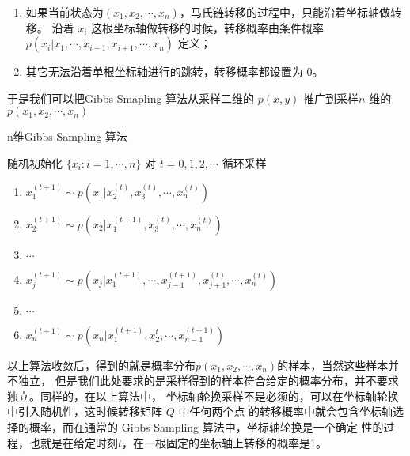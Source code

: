 \begin{enumerate}
\item 如果当前状态为$(x_1,x_2,\cdots, x_n)$，马氏链转移的过程中，只能沿着坐标轴做转移。
沿着 $x_i$ 这根坐标轴做转移的时候，转移概率由条件概率
 $p(x_i|x_1, \cdots, x_{i-1}, x_{i+1}, \cdots, x_n)$ 定义；
\item 其它无法沿着单根坐标轴进行的跳转，转移概率都设置为 0。
\end{enumerate}

于是我们可以把Gibbs Smapling 算法从采样二维的 $p(x,y)$ 推广到采样$n$ 维的 $p(x_1,x_2,\cdots, x_n)$
\begin{algorithm}[htb]
\caption{n维Gibbs Sampling 算法}
\begin{algorithmic}[1]
\STATE 随机初始化 $\{x_i : i =1, \cdots, n\}$
\STATE 对 $t=0,1,2,\cdots$ 循环采样
\begin{enumerate}
\item  $x_1^{(t+1)} \sim p(x_1|x_2^{(t)}, x_3^{(t)}, \cdots, x_n^{(t)})$
\item  $x_2^{(t+1)} \sim p(x_2|x_1^{(t+1)}, x_3^{(t)}, \cdots, x_n^{(t)})$
\item  $\cdots$
\item  $x_j^{(t+1)} \sim p(x_j|x_1^{(t+1)}, \cdots, x_{j-1}^{(t+1)}, x_{j+1}^{(t)}, \cdots, x_n^{(t)})$
\item  $\cdots$
\item  $x_n^{(t+1)} \sim p(x_n|x_1^{(t+1)}, x_2^t, \cdots, x_{n-1}^{(t+1)})$
\end{enumerate}
\end{algorithmic}
\end{algorithm}

以上算法收敛后，得到的就是概率分布$p(x_1,x_2,\cdots, x_n)$的样本，当然这些样本并不独立，
但是我们此处要求的是采样得到的样本符合给定的概率分布，并不要求独立。同样的，在以上算法中，
坐标轴轮换采样不是必须的，可以在坐标轴轮换中引入随机性，这时候转移矩阵 $Q$ 中任何两个点
的转移概率中就会包含坐标轴选择的概率，而在通常的 Gibbs Sampling 算法中，坐标轴轮换是一个确定
性的过程，也就是在给定时刻$t$，在一根固定的坐标轴上转移的概率是1。


